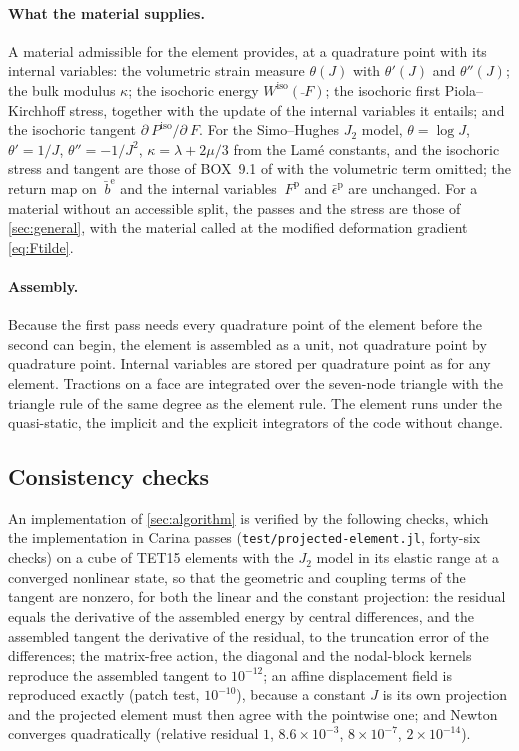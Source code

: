 \documentclass{article}
\newcommand{\F}{~F}
\renewcommand{\P}{~P}
\newcommand{\supiso}{^{\mathrm{iso}}}
\newcommand{\code}[1]{\texttt{#1}}
\theoremstyle{definition}
\theoremstyle{plain}
\begin{document}
\paragraph{What the material supplies.} A material admissible for the
element provides, at a quadrature point with its internal variables: the
volumetric strain measure $\theta(J)$ with $\theta'(J)$ and $\theta''(J)$;
the bulk modulus $\kappa$; the isochoric energy $W\supiso(\bar\F)$; the
isochoric first Piola--Kirchhoff stress, together with the update of the
internal variables it entails; and the isochoric tangent
$\partial\P\supiso/\partial\F$. For the Simo--Hughes $J_2$ model,
$\theta = \log J$, $\theta' = 1/J$, $\theta'' = -1/J^2$, $\kappa = \lambda +
2\mu/3$ from the Lam\'e constants, and the isochoric stress and tangent are
those of BOX~9.1 of \textcite{SimoHughes:1998} with the volumetric term
omitted; the return map on $\bar{~b}^{\mathrm e}$ and the internal
variables $\F^{\mathrm p}$ and $\bar\epsilon^{\mathrm p}$ are unchanged.
For a material without an accessible split, the passes and the stress are
those of \cref{sec:general}, with the material called at the modified
deformation gradient \eqref{eq:Ftilde}.

\paragraph{Assembly.} Because the first pass needs every quadrature point
of the element before the second can begin, the element is assembled as a
unit, not quadrature point by quadrature point. Internal variables are
stored per quadrature point as for any element. Tractions on a face are
integrated over the seven-node triangle with the triangle rule of the same
degree as the element rule. The element runs under the quasi-static, the
implicit and the explicit integrators of the code without change.

\subsection{Consistency checks}
\label{sec:checks}

An implementation of \cref{sec:algorithm} is verified by the following
checks, which the implementation in Carina passes
(\code{test/projected-element.jl}, forty-six checks) on a cube of
TET15 elements with the $J_2$ model in its elastic range at a
converged nonlinear state, so that the geometric and coupling terms of the
tangent are nonzero, for both the linear and the constant projection:
the residual equals the derivative of the assembled energy by central
differences, and the assembled tangent the derivative of the residual, to
the truncation error of the differences; the matrix-free action, the
diagonal and the nodal-block kernels reproduce the assembled tangent to
$10^{-12}$; an affine displacement field is reproduced exactly (patch test,
$10^{-10}$), because a constant $J$ is its own projection and the projected
element must then agree with the pointwise one; and Newton converges
quadratically (relative residual $1$, $8.6\times10^{-3}$, $8\times10^{-7}$,
$2\times10^{-14}$).
\end{document}
